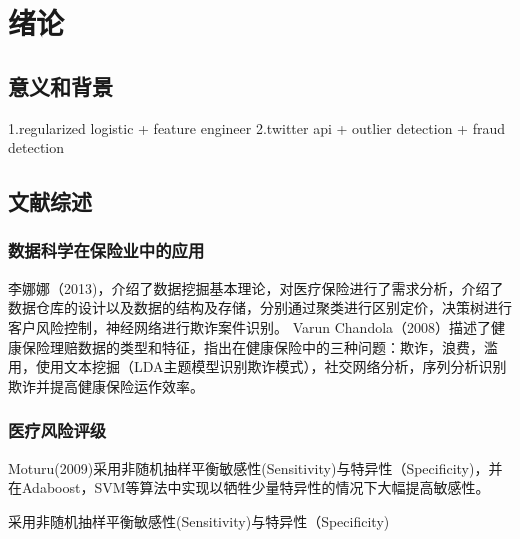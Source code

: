 \chapter{绪论}
\section{意义和背景}
1.regularized logistic + feature engineer
2.twitter api + outlier detection + fraud detection
\section{文献综述}



\subsection{数据科学在保险业中的应用}
李娜娜（2013)，介绍了数据挖掘基本理论，对医疗保险进行了需求分析，介绍了数据仓库的设计以及数据的结构及存储，分别通过聚类进行区别定价，决策树进行客户风险控制，神经网络进行欺诈案件识别。
Varun Chandola（2008）描述了健康保险理赔数据的类型和特征，指出在健康保险中的三种问题：欺诈，浪费，滥用，使用文本挖掘（LDA主题模型识别欺诈模式），社交网络分析，序列分析识别欺诈并提高健康保险运作效率。

\subsection{医疗风险评级}
Moturu(2009)\cite{Moturu2009}采用非随机抽样平衡敏感性(Sensitivity)与特异性（Specificity)，并在Adaboost，SVM等算法中实现以牺牲少量特异性的情况下大幅提高敏感性。




\cite{Moturu2009}采用非随机抽样平衡敏感性(Sensitivity)与特异性（Specificity)